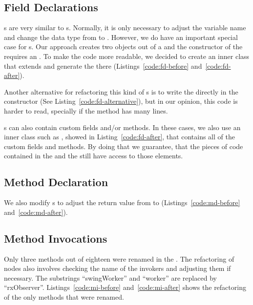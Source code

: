 \documentclass[type=bsc,accentcolor=tud9c]{tudthesis}
\begin{document}


\subsection{Field Declarations}
\label{sec:imp-fieldDeclaration}
s are very similar to s. Normally, it is only necessary to adjust the variable name and change the data type from  to . However, we do have an important special case for s. Our approach creates two objects out of a  and the constructor of the  requires an . To make the code more readable, we decided to create an inner class that extends  and generate the  there (Listings~\ref{code:fd-before} and~\ref{code:fd-after}).



Another alternative for refactoring this kind of s is to write the  directly in the constructor (See Listing~\ref{code:fd-alternative}), but in our opinion, this code is harder to read, specially if the method  has many lines.



s can also contain custom fields and/or methods. In these cases, we also use an inner class such as , showed in Listing~\ref{code:fd-after}, that contains all of the custom fields and methods. By doing that we guarantee, that the pieces of code contained in the  and the  still have access to those elements.

\subsection{Method Declaration}
\label{sec:imp-methodDecl}
We also modify s to adjust the return value from  to  (Listings~\ref{code:md-before} and~\ref{code:md-after}).



\subsection{Method Invocations}
\label{sec:imp-methodInvocation}
Only three methods out of eighteen were renamed in the . The refactoring of  nodes also involves checking the name of the invokers and adjusting them if necessary. The substrings ``swingWorker'' and ``worker'' are replaced by ``rxObserver''. Listings~\ref{code:mi-before} and~\ref{code:mi-after} shows the refactoring of the only methods that were renamed.
\end{document}
